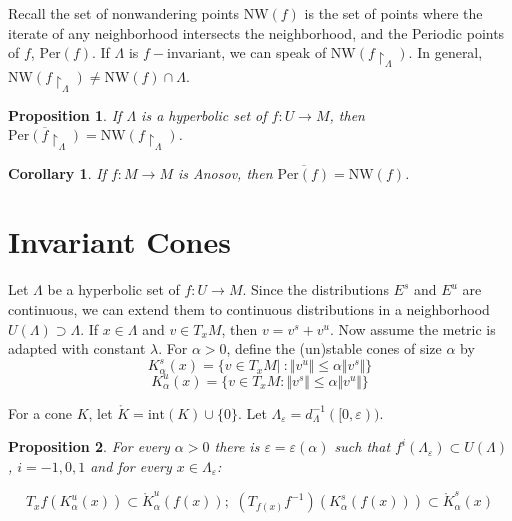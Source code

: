 \documentclass{article}
\newtheorem{prop}{Proposition}
\newtheorem{cor}{Corollary}
\begin{document}
Recall the set of nonwandering points $\mathrm{NW}(f)$ is the set of points where the iterate of any neighborhood intersects the neighborhood, and the Periodic points of $f$, $\mathrm{Per}(f)$. If $\Lambda$ is $f-$invariant, we can speak of $\mathrm{NW}(f \restriction_{\Lambda})$. In general, $\mathrm{NW}(f \restriction_{\Lambda}) \neq \mathrm{NW}(f) \cap \Lambda$.

\begin{prop}

If $\Lambda$ is a hyperbolic set of $f:U \to M$, then $\overline{\mathrm{Per}(f\restriction_{\Lambda})} = \mathrm{NW}(f \restriction_{\Lambda})$.

\end{prop}

\begin{cor}
If $f:M \to M$ is Anosov, then $\overline{\mathrm{Per}(f)}=\mathrm{NW}(f)$.
\end{cor}

\section{Invariant Cones}

\indent Let $\Lambda$ be a hyperbolic set of $f:U \to M$. Since the distributions $E^s$ and $E^u$ are continuous, we can extend them to continuous distributions in a neighborhood $U(\Lambda) \supset \Lambda$. If $x \in \Lambda$ and $v \in T_xM$, then $v=v^s+v^u$. Now assume the metric is adapted with constant $\lambda$. For $\alpha >0$, define the (un)stable cones of size $\alpha$ by 
\[K^s_{\alpha}(x)=\{ v \in T_xM|\ : \Vert v^u \Vert \leq \alpha \Vert v^s \Vert \}\]
\[K^u_{\alpha}(x) = \{ v \in T_xM : \Vert v^s \Vert \leq \alpha \Vert v^u \Vert \}\]

\indent For a cone $K$, let $\mathring{K}=\mathrm{int}(K) \cup \{0\}$. Let $\Lambda_{\varepsilon}= d_{\Lambda}^{-1}([0,\varepsilon))$.

\begin{prop}

For every $\alpha>0$ there is $\varepsilon=\varepsilon(\alpha)$ such that $f^i(\Lambda_{\varepsilon}) \subset U(\Lambda)$, $i=-1,0,1$ and for every $x \in \Lambda_{\varepsilon}$:

\[T_xf(K^u_{\alpha}(x)) \subset \mathring{K}^u_{\alpha}(f(x)); \hspace{4pt} (T_{f(x)}f^{-1})(K^s_{\alpha}(f(x))) \subset \mathring{K}^{s}_{\alpha}(x)\]

\end{prop}
\end{document}

